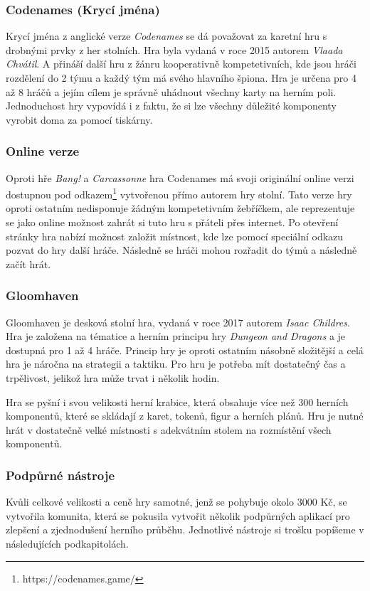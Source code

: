 \subsubsection{Codenames (Krycí jména)}
\label{subsubsec:popular-board-games-analysis-codenames}
Krycí jména z anglické verze \textit{Codenames} se dá považovat za karetní hru s drobnými prvky z her stolních. Hra byla vydaná v roce 2015 autorem \textit{Vlaada Chvátil}. A přináší další hru z žánru kooperativně kompetetivních, kde jsou hráči rozdělení do 2 týmu a každý tým má svého hlavního špiona. Hra je určena pro 4 až 8 hráčů a jejím cílem je správně uhádnout všechny karty na herním poli. Jednoduchost hry vypovídá i z faktu, že si lze všechny důležité komponenty vyrobit doma za pomocí tiskárny.

\subsubsection*{Online verze}
\label{subsubsec:popular-board-games-analysis-codenames-online}
Oproti hře \textit{Bang!} a \textit{Carcassonne} hra Codenames má svoji originální online verzi dostupnou pod odkazem\footnote{https://codenames.game/} vytvořenou přímo autorem hry stolní. Tato verze hry oproti ostatním nedisponuje žádným kompetetivním žebříčkem, ale reprezentuje se jako online možnost zahrát si tuto hru s přáteli přes internet. Po otevření stránky hra nabízí možnost založit místnost, kde lze pomocí speciální odkazu pozvat do hry další hráče. Následně se hráči mohou rozřadit do týmů a následně začít hrát.

\subsubsection{Gloomhaven}
\label{subsubsec:popular-board-games-analysis-gloomhaven}
Gloomhaven je desková stolní hra, vydaná v roce 2017 autorem \textit{Isaac Childres}. Hra je založena na tématice a herním principu hry \textit{Dungeon and Dragons} a je dostupná pro 1 až 4 hráče. Princip hry je oproti ostatním násobně složitější a celá hra je náročna na strategii a taktiku. Pro hru je potřeba mít dostatečný čas a trpělivost, jelikož hra může trvat i několik hodin.

Hra se pyšní i svou velikosti herní krabice, která obsahuje více než 300 herních komponentů, které se skládají z karet, tokenů, figur a herních plánů. Hru je nutné hrát v dostatečně velké místnosti s adekvátním stolem na rozmístění všech komponentů.

\subsubsection*{Podpůrné nástroje}
\label{subsubsec:popular-board-games-analysis-gloomhaven-support-tools}
Kvůli celkové velikosti a ceně hry samotné, jenž se pohybuje okolo 3000 Kč, se vytvořila komunita, která se pokusila vytvořit několik podpůrných aplikací pro zlepšení a zjednodušení herního průběhu. Jednotlivé nástroje si trošku popíšeme v následujících podkapitolách.

